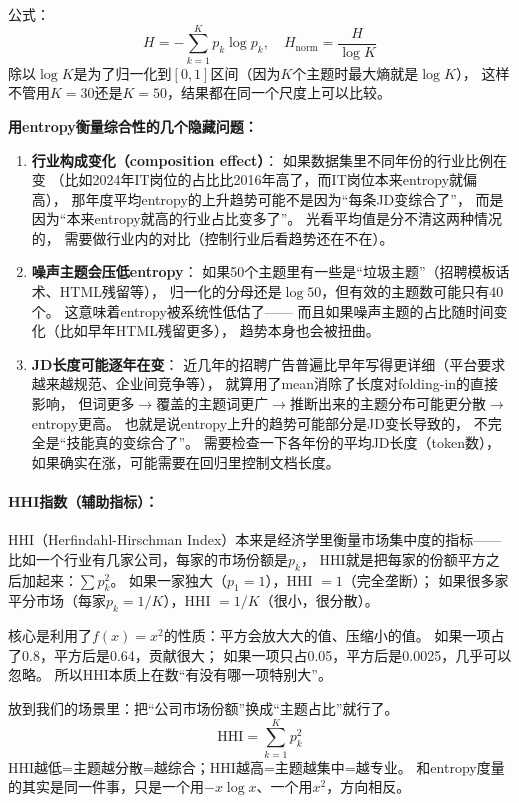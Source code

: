 \documentclass[12pt,a4paper]{ctexart}
\begin{document}
公式：
\[
H = -\sum_{k=1}^{K} p_k \log p_k, \quad
H_{\text{norm}} = \frac{H}{\log K}
\]
除以$\log K$是为了归一化到$[0, 1]$区间（因为$K$个主题时最大熵就是$\log K$），
这样不管用$K=30$还是$K=50$，结果都在同一个尺度上可以比较。

\textbf{用entropy衡量综合性的几个隐藏问题：}

\begin{enumerate}
\item \textbf{行业构成变化（composition effect）}：
如果数据集里不同年份的行业比例在变
（比如2024年IT岗位的占比比2016年高了，而IT岗位本来entropy就偏高），
那年度平均entropy的上升趋势可能不是因为``每条JD变综合了''，
而是因为``本来entropy就高的行业占比变多了''。
光看平均值是分不清这两种情况的，
需要做行业内的对比（控制行业后看趋势还在不在）。

\item \textbf{噪声主题会压低entropy}：
如果50个主题里有一些是``垃圾主题''（招聘模板话术、HTML残留等），
归一化的分母还是$\log 50$，但有效的主题数可能只有40个。
这意味着entropy被系统性低估了——
而且如果噪声主题的占比随时间变化（比如早年HTML残留更多），
趋势本身也会被扭曲。

\item \textbf{JD长度可能逐年在变}：
近几年的招聘广告普遍比早年写得更详细（平台要求越来越规范、企业间竞争等），
就算用了mean消除了长度对folding-in的直接影响，
但词更多$\to$覆盖的主题词更广$\to$推断出来的主题分布可能更分散$\to$entropy更高。
也就是说entropy上升的趋势可能部分是JD变长导致的，
不完全是``技能真的变综合了''。
需要检查一下各年份的平均JD长度（token数），
如果确实在涨，可能需要在回归里控制文档长度。
\end{enumerate}

\paragraph{HHI指数（辅助指标）：}

HHI（Herfindahl-Hirschman Index）本来是经济学里衡量市场集中度的指标——
比如一个行业有几家公司，每家的市场份额是$p_k$，
HHI就是把每家的份额平方之后加起来：$\sum p_k^2$。
如果一家独大（$p_1 = 1$），HHI $= 1$（完全垄断）；
如果很多家平分市场（每家$p_k = 1/K$），HHI $= 1/K$（很小，很分散）。

核心是利用了$f(x) = x^2$的性质：平方会放大大的值、压缩小的值。
如果一项占了0.8，平方后是0.64，贡献很大；
如果一项只占0.05，平方后是0.0025，几乎可以忽略。
所以HHI本质上在数``有没有哪一项特别大''。

放到我们的场景里：把``公司市场份额''换成``主题占比''就行了。
\[
\text{HHI} = \sum_{k=1}^{K} p_k^2
\]
HHI越低=主题越分散=越综合；HHI越高=主题越集中=越专业。
和entropy度量的其实是同一件事，只是一个用$-x\log x$、一个用$x^2$，方向相反。
\end{document}
